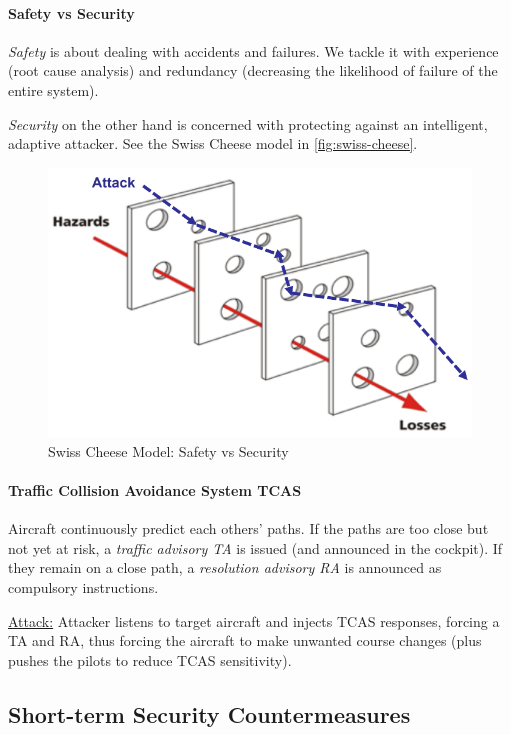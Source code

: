 \paragraph{Safety vs Security}
\textit{Safety} is about dealing with accidents and failures.
We tackle it with experience (root cause analysis) and redundancy (decreasing the likelihood of failure of the entire system).

\textit{Security} on the other hand is concerned with protecting against an intelligent, adaptive attacker.
See the Swiss Cheese model in \autoref{fig:swiss-cheese}.

\begin{figure}[h]
	\centering
	\includegraphics[scale=0.5]{images/6-swiss-cheese.png}
	\caption{Swiss Cheese Model: Safety vs Security}%
	\label{fig:swiss-cheese}
\end{figure}

\paragraph{Traffic Collision Avoidance System TCAS}
Aircraft continuously predict each others' paths.
If the paths are too close but not yet at risk, a \textit{traffic advisory TA} is issued (and announced in the cockpit).
If they remain on a close path, a \textit{resolution advisory RA} is announced as compulsory instructions.

\underline{Attack:}
Attacker listens to target aircraft and injects TCAS responses, forcing a TA and RA, thus forcing the aircraft to make unwanted course changes (plus pushes the pilots to reduce TCAS sensitivity).



\subsection{Short-term Security Countermeasures}


